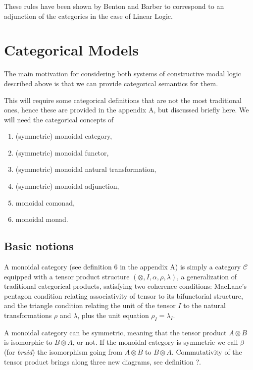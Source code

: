 \documentclass{article}
\newcommand{\cat}[1]{\mathcal{#1}}
\begin{document}
These rules have been shown by Benton \cite{benton1995} and Barber to correspond to an adjunction of the categories in the case of Linear Logic.  

\section{Categorical Models}
\label{sec:single_adjoint_model_of_cs4}
The main motivation for considering both systems of constructive modal logic described above is that we can provide  categorical semantics for them.

This will require  some categorical definitions that are not the most traditional ones, hence  these are provided in the appendix A, but discussed briefly here.  We will need the categorical concepts of 
\begin{enumerate}
    \item {(symmetric) monoidal category},
    \item {(symmetric) monoidal functor},
    \item {(symmetric) monoidal natural transformation},
    \item {(symmetric) monoidal adjunction},
    \item {monoidal comonad}, 
    \item {monoidal monad.}
\end{enumerate}  

\subsection{Basic notions}
A  monoidal category (see definition 6 %
in the appendix A) is simply a category $\cat{C}$  equipped with a tensor product structure $(\otimes, I, \alpha, \rho, \lambda)$,  a generalization of traditional categorical products, satisfying two coherence conditions: MacLane's pentagon condition relating associativity of tensor to its bifunctorial structure, and the triangle condition relating the unit of the tensor $I$ to the natural transformations $\rho$ and $\lambda$,  plus the unit equation $\rho_I=\lambda_I$.
    
  A monoidal category can be symmetric, meaning that the tensor product $A\otimes B$ is isomorphic to $B\otimes A$, or not. If the monoidal category is symmetric we call $\beta$ (for  \textit{braid}) the isomorphism going from $ A\otimes B$ to $B\otimes A$. 
  Commutativity of the tensor product brings along  three new diagrams, see definition ?.
  
\end{document}

